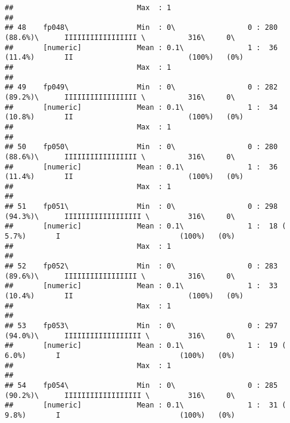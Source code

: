\documentclass[]{article}
\begin{document}
\begin{verbatim}
##                             Max  : 1                                                                                       
## 
## 48    fp048\                Min  : 0\                 0 : 280 (88.6%)\      IIIIIIIIIIIIIIIII \          316\     0\       
##       [numeric]             Mean : 0.1\               1 :  36 (11.4%)       II                           (100%)   (0%)     
##                             Max  : 1                                                                                       
## 
## 49    fp049\                Min  : 0\                 0 : 282 (89.2%)\      IIIIIIIIIIIIIIIII \          316\     0\       
##       [numeric]             Mean : 0.1\               1 :  34 (10.8%)       II                           (100%)   (0%)     
##                             Max  : 1                                                                                       
## 
## 50    fp050\                Min  : 0\                 0 : 280 (88.6%)\      IIIIIIIIIIIIIIIII \          316\     0\       
##       [numeric]             Mean : 0.1\               1 :  36 (11.4%)       II                           (100%)   (0%)     
##                             Max  : 1                                                                                       
## 
## 51    fp051\                Min  : 0\                 0 : 298 (94.3%)\      IIIIIIIIIIIIIIIIII \         316\     0\       
##       [numeric]             Mean : 0.1\               1 :  18 ( 5.7%)       I                            (100%)   (0%)     
##                             Max  : 1                                                                                       
## 
## 52    fp052\                Min  : 0\                 0 : 283 (89.6%)\      IIIIIIIIIIIIIIIII \          316\     0\       
##       [numeric]             Mean : 0.1\               1 :  33 (10.4%)       II                           (100%)   (0%)     
##                             Max  : 1                                                                                       
## 
## 53    fp053\                Min  : 0\                 0 : 297 (94.0%)\      IIIIIIIIIIIIIIIIII \         316\     0\       
##       [numeric]             Mean : 0.1\               1 :  19 ( 6.0%)       I                            (100%)   (0%)     
##                             Max  : 1                                                                                       
## 
## 54    fp054\                Min  : 0\                 0 : 285 (90.2%)\      IIIIIIIIIIIIIIIIII \         316\     0\       
##       [numeric]             Mean : 0.1\               1 :  31 ( 9.8%)       I                            (100%)   (0%)     

\end{verbatim}
\end{document}
